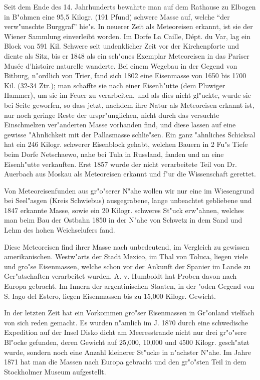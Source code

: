 \documentclass[a4paper, 11pt, oneside]{article}
\begin{document}
Seit dem Ende des 14. Jahrhunderts bewahrte man auf dem Rathause zu Elbogen in B"ohmen eine 95,5 Kilogr. (191 Pfund) schwere Masse auf, welche "`der verw"unschte Burggraf"' hie"s. In neuerer Zeit als Meteoreisen erkannt, ist sie der Wiener Sammlung einverleibt worden. Im Dorfe La Caille, Dépt. du Var, lag ein Block von 591 Kil. Schwere seit undenklicher Zeit vor der Kirchenpforte und diente als Sitz, bis er 1848 als ein sch"ones Exemplar Meteoreisen in das Pariser Musée d'histoire naturelle wanderte. Bei einem Wegebau in der Gegend von Bitburg, n"ordlich von Trier, fand sich 1802 eine Eisenmasse von 1650 bis 1700 Kil. (32-34 Ztr.); man schaffte sie nach einer Eisenh"utte (dem Pluwiger Hammer), um sie im Feuer zu verarbeiten, und als dies nicht gl"uckte, wurde sie bei Seite geworfen, so dass jetzt, nachdem ihre Natur als Meteoreisen erkannt ist, nur noch geringe Reste der urspr"unglichen, nicht durch das versuchte Einschmelzen ver"anderten Masse vorhanden find, und diese lassen auf eine gewisse "Ahnlichkeit mit der Pallasmasse schlie"sen. Ein ganz "ahnliches Schicksal hat ein 246 Kilogr. schwerer Eisenblock gehabt, welchen Bauern in 2 Fu"s Tiefe beim Dorfe Netschaewo, nahe bei Tula in Russland, fanden und an eine Eisenh"utte verkauften. Erst 1857 wurde der nicht verarbeitete Teil von Dr. Auerbach aus Moskau als Meteoreisen erkannt und f"ur die Wissenschaft gerettet.

Von Meteoreisenfunden aus gr"o"serer N"ahe wollen wir nur eine im Wiesengrund bei Seel"asgen (Kreis Schwiebus) ausgegrabene, lange unbeachtet gebliebene und 1847 erkannte Masse, sowie ein 20 Kilogr. schweres St"uck erw"ahnen, welches man beim Bau der Ostbahn 1850 in der N"ahe von Schwetz in dem Sand und Lehm des hohen Weichselufers fand.

Diese Meteoreisen find ihrer Masse nach unbedeutend, im Vergleich zu gewissen amerikanischen. Westw"arts der Stadt Mexico, im Thal von Toluca, liegen viele und gro"se Eisenmassen, welche schon vor der Ankunft der Spanier im Lande zu Ger"atschaften verarbeitet wurden. A. v. Humboldt hat Proben davon nach Europa gebracht. Im Innern der argentinischen Staaten, in der "oden Gegend von S. Iago del Estero, liegen Eisenmassen bis zu 15,000 Kilogr. Gewicht.

In der letzten Zeit hat ein Vorkommen gro"ser Eisenmassen in Gr"onland vielfach von sich reden gemacht. Es wurden n"amlich im J. 1870 durch eine schwedische Expedition auf der Insel Disko dicht am Meeresstrande nicht nur drei gr"o"sere Bl"ocke gefunden, deren Gewicht auf 25,000, 10,000 und 4500 Kilogr. gesch"atzt wurde, sondern noch eine Anzahl kleinerer St"ucke in n"achster N"ahe. Im Jahre 1871 hat man die Massen nach Europa gebracht und den gr"o"sten Teil in dem Stockholmer Museum aufgestellt.
\end{document}
